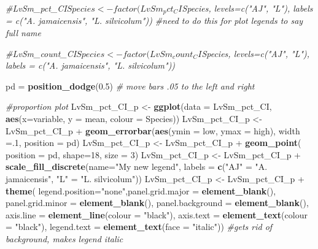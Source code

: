 \documentclass[]{article}
\newenvironment{Shaded}{\begin{snugshade}}{\end{snugshade}}
\newcommand{\KeywordTok}[1]{\textcolor[rgb]{0.13,0.29,0.53}{\textbf{{#1}}}}
\newcommand{\DataTypeTok}[1]{\textcolor[rgb]{0.13,0.29,0.53}{{#1}}}
\newcommand{\DecValTok}[1]{\textcolor[rgb]{0.00,0.00,0.81}{{#1}}}
\newcommand{\FloatTok}[1]{\textcolor[rgb]{0.00,0.00,0.81}{{#1}}}
\newcommand{\StringTok}[1]{\textcolor[rgb]{0.31,0.60,0.02}{{#1}}}
\newcommand{\CommentTok}[1]{\textcolor[rgb]{0.56,0.35,0.01}{\textit{{#1}}}}
\newcommand{\NormalTok}[1]{{#1}}
\begin{document}
\begin{Shaded}
\begin{Highlighting}[]
\CommentTok{#LvSm_pct_CI$Species <- factor(LvSm_pct_CI$Species, levels=c("AJ", "L"), labels = c("A. jamaicensis", "L. silvicolum")) #need to do this for plot legends to say full name}

\CommentTok{#LvSm_count_CI$Species <- factor(LvSm_count_CI$Species, levels=c("AJ", "L"), labels = c("A. jamaicensis", "L. silvicolum"))}


\NormalTok{pd =}\StringTok{ }\KeywordTok{position_dodge}\NormalTok{(}\FloatTok{0.5}\NormalTok{) }\CommentTok{# move bars .05 to the left and right}

\CommentTok{#proportion plot}
\NormalTok{LvSm_pct_CI_p <-}\StringTok{ }\KeywordTok{ggplot}\NormalTok{(}\DataTypeTok{data =} \NormalTok{LvSm_pct_CI, }\KeywordTok{aes}\NormalTok{(}\DataTypeTok{x=}\NormalTok{variable, }\DataTypeTok{y =} \NormalTok{mean, }\DataTypeTok{colour =} \NormalTok{Species))}
\NormalTok{LvSm_pct_CI_p <-}\StringTok{ }\NormalTok{LvSm_pct_CI_p +}\StringTok{ }\KeywordTok{geom_errorbar}\NormalTok{(}\KeywordTok{aes}\NormalTok{(}\DataTypeTok{ymin =} \NormalTok{low, }\DataTypeTok{ymax =} \NormalTok{high), }\DataTypeTok{width =}\NormalTok{.}\DecValTok{1}\NormalTok{, }\DataTypeTok{position =} \NormalTok{pd)}
\NormalTok{LvSm_pct_CI_p <-}\StringTok{ }\NormalTok{LvSm_pct_CI_p +}\StringTok{ }\KeywordTok{geom_point}\NormalTok{( }\DataTypeTok{position =} \NormalTok{pd, }\DataTypeTok{shape=}\DecValTok{18}\NormalTok{, }\DataTypeTok{size =} \DecValTok{3}\NormalTok{)}
\NormalTok{LvSm_pct_CI_p <-}\StringTok{ }\NormalTok{LvSm_pct_CI_p +}\StringTok{ }\KeywordTok{scale_fill_discrete}\NormalTok{(}\DataTypeTok{name=}\StringTok{"My new legend"}\NormalTok{, }\DataTypeTok{labels =} \KeywordTok{c}\NormalTok{(}\StringTok{"AJ"} \NormalTok{=}\StringTok{ "A. jamaicensis"}\NormalTok{, }\StringTok{"L"} \NormalTok{=}\StringTok{ "L. silvicolum"}\NormalTok{)) }
\NormalTok{LvSm_pct_CI_p <-}\StringTok{ }\NormalTok{LvSm_pct_CI_p +}\StringTok{  }\KeywordTok{theme}\NormalTok{( }\DataTypeTok{legend.position=}\StringTok{"none"}\NormalTok{,}\DataTypeTok{panel.grid.major =} \KeywordTok{element_blank}\NormalTok{(), }\DataTypeTok{panel.grid.minor =} \KeywordTok{element_blank}\NormalTok{(),}
\DataTypeTok{panel.background =} \KeywordTok{element_blank}\NormalTok{(), }\DataTypeTok{axis.line =} \KeywordTok{element_line}\NormalTok{(}\DataTypeTok{colour =} \StringTok{"black"}\NormalTok{), }\DataTypeTok{axis.text =} \KeywordTok{element_text}\NormalTok{(}\DataTypeTok{colour =} \StringTok{"black"}\NormalTok{), }\DataTypeTok{legend.text =} \KeywordTok{element_text}\NormalTok{(}\DataTypeTok{face =} \StringTok{"italic"}\NormalTok{))  }\CommentTok{#gets rid of background, makes legend italic}


\end{Highlighting}
\end{Shaded}
\end{document}
